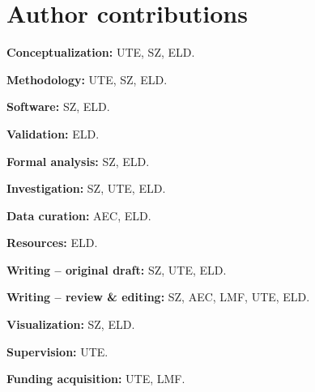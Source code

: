 \documentclass[12pt]{article}
\begin{document}
\section*{Author contributions}

\noindent\textbf{Conceptualization:} UTE, SZ, ELD.\par
\noindent\textbf{Methodology:} UTE, SZ, ELD.\par
\noindent\textbf{Software:} SZ, ELD.\par
\noindent\textbf{Validation:} ELD.\par
\noindent\textbf{Formal analysis:} SZ, ELD.\par
\noindent\textbf{Investigation:} SZ, UTE, ELD.\par
\noindent\textbf{Data curation:} AEC, ELD.\par
\noindent\textbf{Resources:} ELD.\par
\noindent\textbf{Writing -- original draft:} SZ, UTE, ELD.\par
\noindent\textbf{Writing -- review \& editing:} SZ, AEC, LMF, UTE, ELD.\par
\noindent\textbf{Visualization:} SZ, ELD.\par
\noindent\textbf{Supervision:} UTE.\par
\noindent\textbf{Funding acquisition:} UTE, LMF.\par





\end{document}
